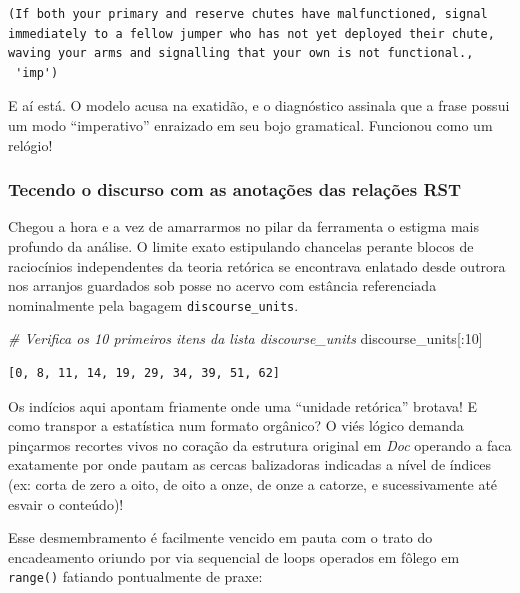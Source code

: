 \documentclass[
  brazilian,
]{article}
\newenvironment{Shaded}{}{}
\newcommand{\CommentTok}[1]{\textcolor[rgb]{0.38,0.63,0.69}{\textit{#1}}}
\newcommand{\DecValTok}[1]{\textcolor[rgb]{0.25,0.63,0.44}{#1}}
\newcommand{\NormalTok}[1]{#1}
\begin{document}
\begin{verbatim}
(If both your primary and reserve chutes have malfunctioned, signal immediately to a fellow jumper who has not yet deployed their chute, waving your arms and signalling that your own is not functional.,
 'imp')
\end{verbatim}

E aí está. O modelo acusa na exatidão, e o diagnóstico assinala que a
frase possui um modo ``imperativo'' enraizado em seu bojo gramatical.
Funcionou como um relógio!

\hypertarget{tecendo-o-discurso-com-as-anotauxe7uxf5es-das-relauxe7uxf5es-rst}{%
\subsubsection{Tecendo o discurso com as anotações das relações
RST}\label{tecendo-o-discurso-com-as-anotauxe7uxf5es-das-relauxe7uxf5es-rst}}

Chegou a hora e a vez de amarrarmos no pilar da ferramenta o estigma
mais profundo da análise. O limite exato estipulando chancelas perante
blocos de raciocínios independentes da teoria retórica se encontrava
enlatado desde outrora nos arranjos guardados sob posse no acervo com
estância referenciada nominalmente pela bagagem
\texttt{discourse\_units}.

\begin{Shaded}
\begin{Highlighting}[]
\CommentTok{\# Verifica os 10 primeiros itens da lista \textquotesingle{}discourse\_units\textquotesingle{}}
\NormalTok{discourse\_units[:}\DecValTok{10}\NormalTok{]}
\end{Highlighting}
\end{Shaded}

\begin{verbatim}
[0, 8, 11, 14, 19, 29, 34, 39, 51, 62]
\end{verbatim}

Os indícios aqui apontam friamente onde uma ``unidade retórica''
brotava! E como transpor a estatística num formato orgânico? O viés
lógico demanda pinçarmos recortes vivos no coração da estrutura original
em \emph{Doc} operando a faca exatamente por onde pautam as cercas
balizadoras indicadas a nível de índices (ex: corta de zero a oito, de
oito a onze, de onze a catorze, e sucessivamente até esvair o conteúdo)!

Esse desmembramento é facilmente vencido em pauta com o trato do
encadeamento oriundo por via sequencial de loops operados em fôlego em
\texttt{range()} fatiando pontualmente de praxe:
\end{document}
